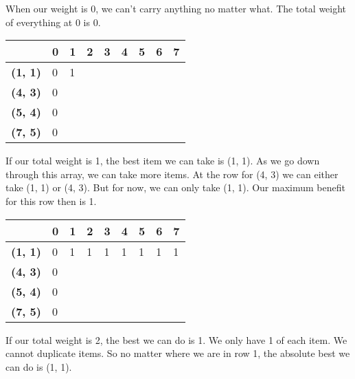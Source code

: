 \documentclass{article}
\begin{document}
When our weight is 0, we can't carry anything no matter what. The total weight of everything at 0 is 0.
\begin{center}
\begin{tabular}{|l|l|l|l|l|l|l|l|l|}
\hline
                & \textbf{0} & \textbf{1} & \textbf{2} & \textbf{3} & \textbf{4} & \textbf{5} & \textbf{6} & \textbf{7} \\ \hline
\textbf{(1, 1)} & 0          &1            &            &            &            &            &            &            \\ \hline
\textbf{(4, 3)} & 0          &            &            &            &            &            &            &            \\ \hline
\textbf{(5, 4)} & 0          &            &            &            &            &            &            &            \\ \hline
\textbf{(7, 5)} & 0          &            &            &            &            &            &            &            \\ \hline
\end{tabular}
\end{center}
If our total weight is 1, the best item we can take is (1, 1). As we go down through this array, we can take more items. At the row for (4, 3) we can either take (1, 1) or (4, 3). But for now, we can only take (1, 1). Our maximum benefit for this row then is 1. 
\begin{center}
\begin{tabular}{|l|l|l|l|l|l|l|l|l|}
\hline
                & \textbf{0} & \textbf{1} & \textbf{2} & \textbf{3} & \textbf{4} & \textbf{5} & \textbf{6} & \textbf{7} \\ \hline
\textbf{(1, 1)} & 0          &1            &1            &1            &1            &1            &1            &1            \\ \hline
\textbf{(4, 3)} & 0          &            &            &            &            &            &            &            \\ \hline
\textbf{(5, 4)} & 0          &            &            &            &            &            &            &            \\ \hline
\textbf{(7, 5)} & 0          &            &            &            &            &            &            &            \\ \hline
\end{tabular}
\end{center}
If our total weight is 2, the best we can do is 1. We only have 1 of each item. We cannot duplicate items. So no matter where we are in row 1, the absolute best we can do is (1, 1).
\end{document}
